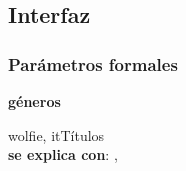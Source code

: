 \subsection{Interfaz}


  \subsubsection{Par\'ametros formales}
   \parbox{1.7cm}{\textbf{g\'eneros}} wolfie, itT\'itulos\\

  \textbf{se explica con}: , 


